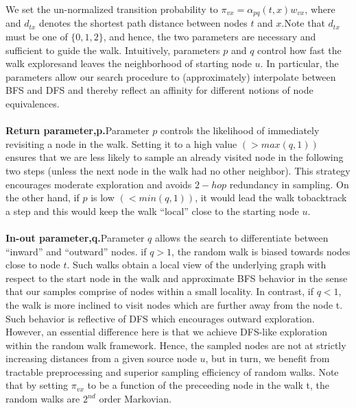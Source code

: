 \documentclass[12pt,a4paper]{article}
\begin{document}
We set the un-normalized transition probability to $\pi_{vx}= \alpha_{pq}(t,x)w_{vx}$, where and $d_{tx}$ denotes the shortest path distance between nodes $t$ and $x$.Note that $d_{tx}$ must be one of $\{0,1,2\}$, and hence, the two parameters are necessary and sufficient to guide the walk. Intuitively, parameters $p$ and $q$ control how fast the walk exploresand leaves the neighborhood of starting node $u$. In particular, the parameters allow our search procedure to (approximately) interpolate between BFS and DFS and thereby reflect an affinity for different notions of node equivalences.
\\ \\
\textbf{Return parameter,p.}Parameter $p$ controls the likelihood of immediately revisiting a node in the walk.  Setting it to a high value $(>max(q,1))$ ensures that we are less likely to sample an already visited  node  in  the  following  two  steps  (unless  the  next  node  in the walk had no other neighbor).  This strategy encourages moderate exploration and avoids $2-hop$ redundancy in sampling.  On the other hand,  if $p$ is low $(<min(q,1))$,  it would lead the walk tobacktrack a step  and this would keep the walk “local” close to the starting node $u$.
\\ \\
\textbf{In-out parameter,q.}Parameter $q$ allows the search to differentiate between “inward” and “outward” nodes. if $q > 1$, the random walk is biased towards nodes close to node $t$. Such walks obtain a local view of the underlying graph with respect to the start node in the walk and approximate BFS behavior in the sense that our samples comprise of nodes within a small locality. In contrast, if $q <1$, the walk is more inclined to visit nodes which are further away from the node t.  Such behavior is reflective of DFS which encourages outward exploration.  However, an essential difference here is that we achieve DFS-like exploration within the random walk framework. Hence, the sampled nodes are not at strictly increasing distances from a given source node $u$, but in turn, we benefit from tractable preprocessing and superior sampling efficiency of random walks.  Note that by setting $\pi_{vx}$ to be a function of the preceeding node in the walk t, the random walks are $2^{nd}$ order Markovian.
\\ \\
\end{document}
